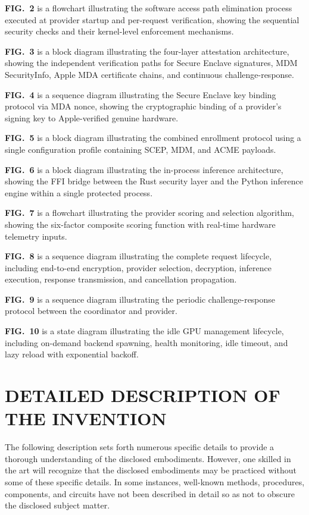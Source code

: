 \documentclass[11pt,letterpaper]{article}
\begin{document}
\textbf{FIG.~2} is a flowchart illustrating the software access path elimination process executed at provider startup and per-request verification, showing the sequential security checks and their kernel-level enforcement mechanisms.

\textbf{FIG.~3} is a block diagram illustrating the four-layer attestation architecture, showing the independent verification paths for Secure Enclave signatures, MDM SecurityInfo, Apple MDA certificate chains, and continuous challenge-response.

\textbf{FIG.~4} is a sequence diagram illustrating the Secure Enclave key binding protocol via MDA nonce, showing the cryptographic binding of a provider's signing key to Apple-verified genuine hardware.

\textbf{FIG.~5} is a block diagram illustrating the combined enrollment protocol using a single configuration profile containing SCEP, MDM, and ACME payloads.

\textbf{FIG.~6} is a block diagram illustrating the in-process inference architecture, showing the FFI bridge between the Rust security layer and the Python inference engine within a single protected process.

\textbf{FIG.~7} is a flowchart illustrating the provider scoring and selection algorithm, showing the six-factor composite scoring function with real-time hardware telemetry inputs.

\textbf{FIG.~8} is a sequence diagram illustrating the complete request lifecycle, including end-to-end encryption, provider selection, decryption, inference execution, response transmission, and cancellation propagation.

\textbf{FIG.~9} is a sequence diagram illustrating the periodic challenge-response protocol between the coordinator and provider.

\textbf{FIG.~10} is a state diagram illustrating the idle GPU management lifecycle, including on-demand backend spawning, health monitoring, idle timeout, and lazy reload with exponential backoff.

\section{DETAILED DESCRIPTION OF THE INVENTION}

The following description sets forth numerous specific details to provide a thorough understanding of the disclosed embodiments. However, one skilled in the art will recognize that the disclosed embodiments may be practiced without some of these specific details. In some instances, well-known methods, procedures, components, and circuits have not been described in detail so as not to obscure the disclosed subject matter.
\end{document}
